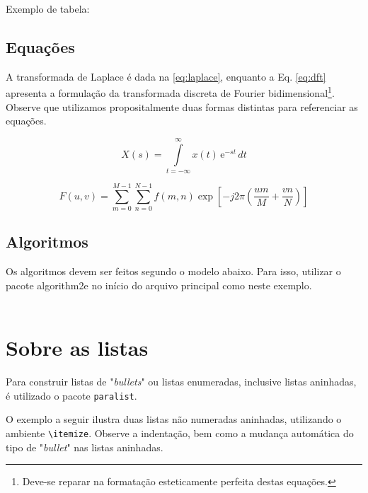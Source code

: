 \begin{apendicesenv}
Exemplo de tabela:



\section{Equações}
\label{sec:equacoes}

A transformada de Laplace é dada na \autoref{eq:laplace}, enquanto a Eq. \ref{eq:dft} apresenta a formulação da transformada discreta de Fourier bidimensional\footnote{Deve-se reparar na formatação esteticamente perfeita destas equações.}. Observe que utilizamos propositalmente duas formas distintas para referenciar as equações.

\begin{equation}
    X(s) = \int\limits_{t = -\infty}^{\infty} x(t) \, \text{e}^{-st} \, dt
    \label{eq:laplace}
\end{equation}

\begin{equation}
    F(u, v) = \sum_{m = 0}^{M - 1} \sum_{n = 0}^{N - 1} f(m, n) \exp \left[ -j 2 \pi \left( \frac{u m}{M} + \frac{v n}{N} \right) \right]
    \label{eq:dft}
\end{equation}

\section{Algoritmos}\label{sec:algoritmos}

Os algoritmos devem ser feitos segundo o modelo abaixo. Para isso, utilizar o pacote {\ttfamily algorithm2e} no início do arquivo principal como neste exemplo.
\\
\\




\chapter{Sobre as listas}
\label{chap:apSobreLista}

Para construir listas de "\textit{bullets}"{} ou listas enumeradas, inclusive listas aninhadas, é utilizado o pacote \verb|paralist|.

O exemplo a seguir ilustra duas listas não numeradas aninhadas, utilizando o ambiente \verb|\itemize|. Observe a indentação, bem como a mudança automática do tipo de "\textit{bullet}"{} nas listas aninhadas.


\end{apendicesenv}
